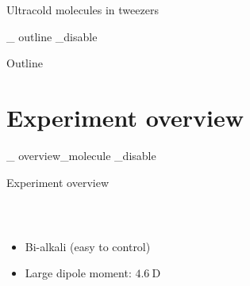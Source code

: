 \documentclass{beamer}
\newcommand\ifSlide[1]{
    \expandafter\ifcsname slide_ #1 _disable \endcsname
    \else
  }
\newcommand\ifSlide[1]{
    \expandafter\ifcsname slide_ #1 _enable \endcsname
  }
\begin{document}
\begin{frame}{Ultracold molecules in tweezers}
\begin{center}
  \end{center}
\end{frame}
\fi

\ifSlide{outline}
\begin{frame}{Outline}
  \tableofcontents
\end{frame}
\fi

\section{Experiment overview}
\ifSlide{overview_molecule}
\begin{frame}[t]{Experiment overview}
  \begin{columns}
    \column{5.8cm}
    \column{5.8cm}
    \begin{center}
      {}\\
      \begin{itemize}
      \item Bi-alkali (easy to control)
      \item Large dipole moment: $4.6~\mathrm{D}$
      \end{itemize}
    \end{center}
  \end{columns}
\end{frame}
\fi
\end{document}
